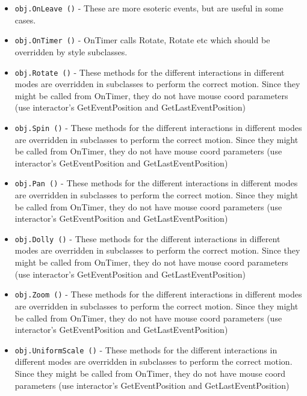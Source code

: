 \begin{itemize}
\item  \verb|obj.OnLeave ()| -  These are more esoteric events, but are useful in some cases.

\item  \verb|obj.OnTimer ()| -  OnTimer calls Rotate, Rotate etc which should be overridden by
 style subclasses.

\item  \verb|obj.Rotate ()| -  These methods for the different interactions in different modes
 are overridden in subclasses to perform the correct motion. Since
 they might be called from OnTimer, they do not have mouse coord parameters
 (use interactor's GetEventPosition and GetLastEventPosition)

\item  \verb|obj.Spin ()| -  These methods for the different interactions in different modes
 are overridden in subclasses to perform the correct motion. Since
 they might be called from OnTimer, they do not have mouse coord parameters
 (use interactor's GetEventPosition and GetLastEventPosition)

\item  \verb|obj.Pan ()| -  These methods for the different interactions in different modes
 are overridden in subclasses to perform the correct motion. Since
 they might be called from OnTimer, they do not have mouse coord parameters
 (use interactor's GetEventPosition and GetLastEventPosition)

\item  \verb|obj.Dolly ()| -  These methods for the different interactions in different modes
 are overridden in subclasses to perform the correct motion. Since
 they might be called from OnTimer, they do not have mouse coord parameters
 (use interactor's GetEventPosition and GetLastEventPosition)

\item  \verb|obj.Zoom ()| -  These methods for the different interactions in different modes
 are overridden in subclasses to perform the correct motion. Since
 they might be called from OnTimer, they do not have mouse coord parameters
 (use interactor's GetEventPosition and GetLastEventPosition)

\item  \verb|obj.UniformScale ()| -  These methods for the different interactions in different modes
 are overridden in subclasses to perform the correct motion. Since
 they might be called from OnTimer, they do not have mouse coord parameters
 (use interactor's GetEventPosition and GetLastEventPosition)


\end{itemize}
